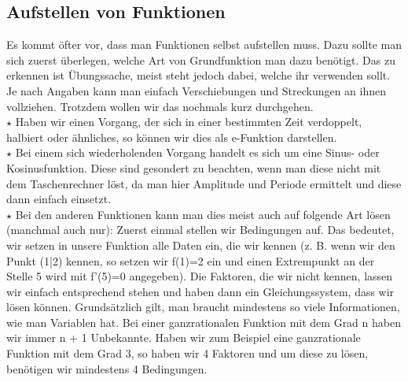 \subsection{Aufstellen von Funktionen}
	Es kommt öfter vor, dass man Funktionen selbst aufstellen muss. Dazu sollte man
	sich zuerst überlegen, welche Art von Grundfunktion man dazu benötigt. Das zu
	erkennen ist Übungssache, meist steht jedoch dabei, welche ihr verwenden sollt.
	Je nach Angaben kann man einfach Verschiebungen und Streckungen an ihnen
	vollziehen. Trotzdem wollen wir das nochmals kurz durchgehen.\\

	\(\star\) Haben wir einen Vorgang, der sich in einer bestimmten Zeit
	verdoppelt, halbiert oder ähnliches, so können wir dies als e-Funktion
	darstellen.\\

	\(\star\) Bei einem sich wiederholenden Vorgang handelt es sich um eine Sinus-
	oder Kosinusfunktion. Diese sind gesondert zu beachten, wenn man diese nicht
	mit dem Taschenrechner löst, da man hier Amplitude und Periode ermittelt und
	diese dann einfach einsetzt.\\

	\(\star\) Bei den anderen Funktionen kann man dies meist auch auf folgende Art
	lösen (manchmal auch nur): Zuerst einmal stellen wir Bedingungen auf. Das
	bedeutet, wir setzen in unsere Funktion alle Daten ein, die wir kennen (z. B.
		wenn wir den Punkt (1|2) kennen, so setzen wir f(1)=2 ein und einen
	Extrempunkt an der Stelle 5 wird mit f'(5)=0 angegeben). Die Faktoren, die wir
	nicht kennen, lassen wir einfach entsprechend stehen und haben dann ein
	Gleichungssystem, dass wir lösen können. Grundsätzlich gilt, man braucht
	mindestens so viele Informationen, wie man Variablen hat. Bei einer
	ganzrationalen Funktion mit dem Grad n haben wir immer n + 1 Unbekannte. Haben
	wir zum Beispiel eine ganzrationale Funktion mit dem Grad 3, so haben wir 4
	Faktoren und um diese zu lösen, benötigen wir mindestens 4 Bedingungen.

